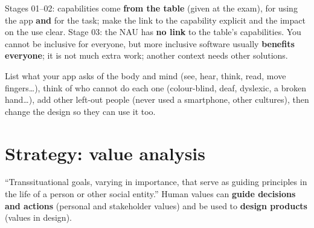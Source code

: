 \documentclass[11pt,a4paper,openany]{book}
\begin{document}
\begin{keybox}[title={How the case studies are graded}]
Stages 01--02: capabilities come \textbf{from the table} (given at the exam), for using the app
\textbf{and} for the task; make the link to the capability explicit and the impact on the use
clear. Stage 03: the NAU has \textbf{no link} to the table's capabilities. You cannot be
inclusive for everyone, but more inclusive software usually \textbf{benefits everyone}; it is
not much extra work; another context needs other solutions.
\end{keybox}

\begin{goatbox}
List what your app asks of the body and mind (see, hear, think, read, move fingers\ldots), think
of who cannot do each one (colour-blind, deaf, dyslexic, a broken hand\ldots), add other left-out
people (never used a smartphone, other cultures), then change the design so they can use it too.
\end{goatbox}


\section{Strategy: value analysis}

\begin{defnbox}[title={Values (Schwartz, 1994)}]
``Transsituational goals, varying in importance, that serve as guiding principles in the life
of a person or other social entity.'' Human values can \textbf{guide decisions and actions}
(personal and stakeholder values) and be used to \textbf{design products} (values in design).
\end{defnbox}
\end{document}
